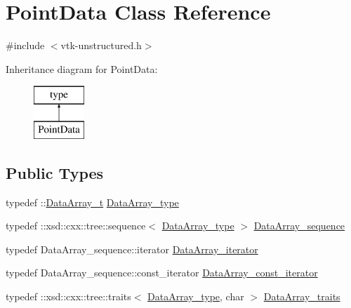 \hypertarget{classPointData}{}\section{Point\+Data Class Reference}
\label{classPointData}


{\ttfamily \#include $<$vtk-\/unstructured.\+h$>$}

Inheritance diagram for Point\+Data\+:\begin{figure}[H]
\begin{center}
\leavevmode
\includegraphics[height=2.000000cm]{classPointData}
\end{center}
\end{figure}
\subsection*{Public Types}
\begin{DoxyCompactItemize}
\item 
typedef \+::\hyperlink{classDataArray__t}{Data\+Array\+\_\+t} \hyperlink{classPointData_a249ad018361c7a9d61f42e1fc8af717f}{Data\+Array\+\_\+type}
\item 
typedef \+::xsd\+::cxx\+::tree\+::sequence$<$ \hyperlink{classPointData_a249ad018361c7a9d61f42e1fc8af717f}{Data\+Array\+\_\+type} $>$ \hyperlink{classPointData_acd882fa412789571fcaa2599ad2b2c71}{Data\+Array\+\_\+sequence}
\item 
typedef Data\+Array\+\_\+sequence\+::iterator \hyperlink{classPointData_afb66f793f2a65ca38e3cd8fa21eef701}{Data\+Array\+\_\+iterator}
\item 
typedef Data\+Array\+\_\+sequence\+::const\+\_\+iterator \hyperlink{classPointData_a6bd3313479b6a109e24bc9e7b306831b}{Data\+Array\+\_\+const\+\_\+iterator}
\item 
typedef \+::xsd\+::cxx\+::tree\+::traits$<$ \hyperlink{classPointData_a249ad018361c7a9d61f42e1fc8af717f}{Data\+Array\+\_\+type}, char $>$ \hyperlink{classPointData_ae9066a14984b6f7aa938ba2d58244055}{Data\+Array\+\_\+traits}
\end{DoxyCompactItemize}
